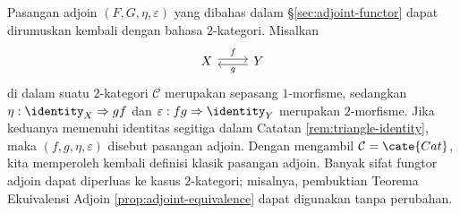 \begin{remark}
	Pasangan adjoin $(F, G, \eta, \varepsilon)$ yang dibahas dalam \S\ref{sec:adjoint-functor} dapat dirumuskan kembali dengan bahasa $2$-kategori. Misalkan
	\[\begin{tikzcd}
		X \arrow[yshift=0.5ex, r, "f"] & Y \arrow[yshift=-0.5ex, l, "g"]
	\end{tikzcd}\]
	di dalam suatu $2$-kategori $\mathcal{C}$ merupakan sepasang $1$-morfisme, sedangkan $\eta: \identity_X \Rightarrow gf$ dan $\varepsilon: fg \Rightarrow \identity_Y$ merupakan $2$-morfisme. Jika keduanya memenuhi identitas segitiga dalam Catatan \ref{rem:triangle-identity}, maka $(f, g, \eta, \varepsilon)$ disebut pasangan adjoin. Dengan mengambil $\mathcal{C} = \cate{Cat}$, kita memperoleh kembali definisi klasik pasangan adjoin. Banyak sifat fungtor adjoin dapat diperluas ke kasus $2$-kategori; misalnya, pembuktian Teorema Ekuivalensi Adjoin \ref{prop:adjoint-equivalence} dapat digunakan tanpa perubahan.
\end{remark}
	

